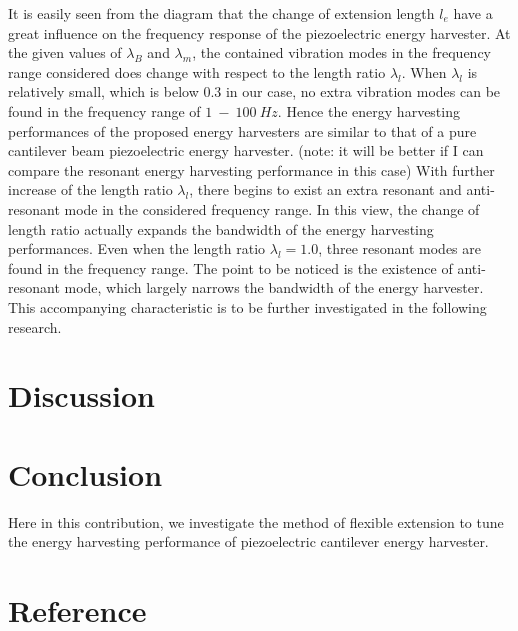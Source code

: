 \documentclass{elsarticle}
\begin{document}
It is easily seen from the diagram that the change of extension length $l_e$ have a great influence on the frequency response of the piezoelectric energy harvester. At the given values of $\lambda_B$ and $\lambda_m$, the contained vibration modes in the frequency range considered does change with respect to the length ratio $\lambda_l$. When $\lambda_l$ is relatively small, which is below $0.3$ in our case, no extra vibration modes can be found in the frequency range of $1\ - \ 100\ Hz$. Hence the energy harvesting performances of the proposed energy harvesters are similar to that of a pure cantilever beam piezoelectric energy harvester. (note: it will be better if I can compare the resonant energy harvesting performance in this case) With further increase of the length ratio $\lambda_l$, there begins to exist an extra resonant and anti-resonant mode in the considered frequency range. In this view, the change of length ratio actually expands the bandwidth of the energy harvesting performances. Even when the length ratio $\lambda_l = 1.0$, three resonant modes are found in the frequency range. The point to be noticed is the existence of anti-resonant mode, which largely narrows the bandwidth of the energy harvester. This accompanying characteristic is to be further investigated in the following research.




\section{Discussion}



\section{Conclusion}

Here in this contribution, we investigate the method of flexible extension to tune the energy harvesting performance of piezoelectric cantilever energy harvester.


\section*{Reference}



\end{document}
